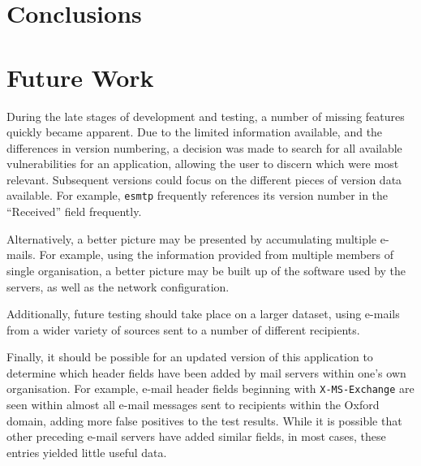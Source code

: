 \section{Conclusions}

\section{Future Work}

During the late stages of development and testing, a number of missing features
quickly became apparent. Due to the limited information available, and the
differences in version numbering, a decision was made to search for all
available vulnerabilities for an application, allowing the user to discern
which were most relevant.  Subsequent versions could focus on the different
pieces of version data available.  For example, \texttt{esmtp} frequently
references its version number in the ``Received'' field frequently.

Alternatively, a better picture may be presented by accumulating multiple
e-mails. For example, using the information provided from multiple members of
single organisation, a better picture may be built up of the software used by
the servers, as well as the network configuration.

Additionally, future testing should take place on a larger dataset, using
e-mails from a wider variety of sources sent to a number of different
recipients.  

Finally, it should be possible for an updated version of this application to
determine which header fields have been added by mail servers within one's own
organisation.  For example, e-mail header fields beginning with
\texttt{X-MS-Exchange} are seen within almost all e-mail messages sent to
recipients within the Oxford domain, adding more false positives to the test
results. While it is possible that other preceding e-mail servers have added
similar fields, in most cases, these entries yielded little useful data.

